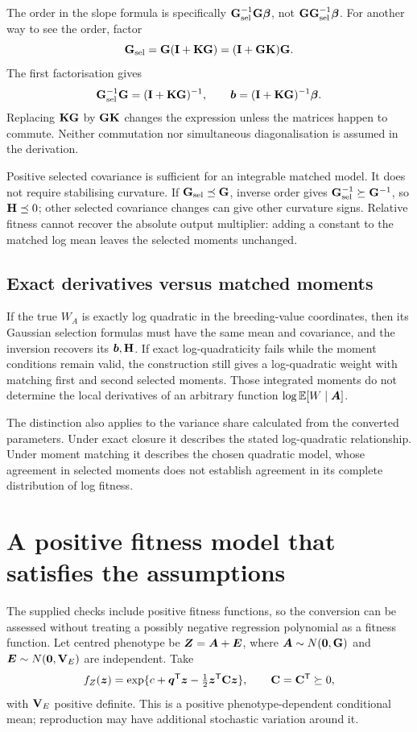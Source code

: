 The order in the slope formula is specifically
\(\mathbf{G}_{\mathrm{sel}}^{-1}\mathbf{G}\boldsymbol{\beta}\), not
\(\mathbf{G}\mathbf{G}_{\mathrm{sel}}^{-1}\boldsymbol{\beta}\). For another way to see the order, factor
\[
 \mathbf{G}_{\mathrm{sel}}=\mathbf{G}(\mathbf{I}+\mathbf{K}\mathbf{G})
      =(\mathbf{I}+\mathbf{G}\mathbf{K})\mathbf{G}.
\]
The first factorisation gives
\[
 \mathbf{G}_{\mathrm{sel}}^{-1}\mathbf{G}=(\mathbf{I}+\mathbf{K}\mathbf{G})^{-1},
 \qquad
 \boldsymbol{b}=(\mathbf{I}+\mathbf{K}\mathbf{G})^{-1}\boldsymbol{\beta}.
\]
Replacing \(\mathbf{K}\mathbf{G}\) by \(\mathbf{G}\mathbf{K}\) changes the expression unless
the matrices happen to commute. Neither commutation nor simultaneous
diagonalisation is assumed in the derivation.

Positive selected covariance is sufficient for an integrable matched model.
It does not require stabilising curvature. If \(\mathbf{G}_{\mathrm{sel}}\preceq\mathbf{G}\), inverse
order gives \(\mathbf{G}_{\mathrm{sel}}^{-1}\succeq\mathbf{G}^{-1}\), so \(\mathbf{H}\preceq0\);
other selected covariance changes can give other curvature signs.
Relative fitness cannot recover the absolute output multiplier:
adding a constant to the matched log mean leaves the selected moments
unchanged.

\subsection{Exact derivatives versus matched moments}

If the true \(W_A\) is exactly log quadratic in the breeding-value coordinates,
then its Gaussian selection formulas must have the same mean and covariance,
and the inversion recovers its \(\boldsymbol{b},\mathbf{H}\). If exact log-quadraticity
fails while the moment conditions remain valid, the construction still gives
a log-quadratic weight with matching first and second selected moments.
Those integrated moments do not determine the local derivatives of an
arbitrary function \(\log\mathbb E[W\mid\boldsymbol{A}]\).

The distinction also applies to the variance share calculated from the
converted parameters. Under exact closure it describes the stated
log-quadratic relationship. Under moment matching it describes the chosen
quadratic model, whose agreement in selected moments does not establish
agreement in its complete distribution of log fitness.

\section{A positive fitness model that satisfies the assumptions}
\label{conversion:positive_model}

The supplied checks include positive fitness functions, so the conversion can
be assessed without treating a possibly negative regression polynomial as a
fitness function. Let centred phenotype be
\(\boldsymbol{Z}=\boldsymbol{A}+\boldsymbol{E}\), where
\(\boldsymbol{A}\sim N(\boldsymbol{0},\mathbf{G})\) and
\(\boldsymbol{E}\sim N(\boldsymbol{0},\mathbf{V}_E)\) are independent. Take
\begin{equation}
 f_Z(\boldsymbol{z})
 =\exp\{c+\boldsymbol{q}^{\mathsf T}\boldsymbol{z}
                  -\tfrac12\boldsymbol{z}^{\mathsf T}\mathbf{C}\boldsymbol{z}\},
 \qquad \mathbf{C}=\mathbf{C}^{\mathsf T}\succeq0,
 \label{conversion:positive_phenotype}
\end{equation}
with \(\mathbf{V}_E\) positive definite. This is a positive phenotype-dependent
conditional mean; reproduction may have additional stochastic variation
around it.

